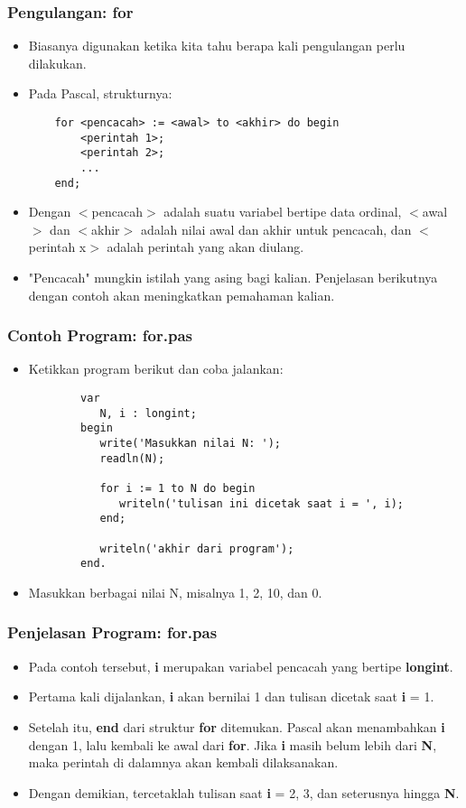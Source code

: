 \documentclass{beamer}
\begin{document}
\begin{frame}[fragile]
\frametitle{Pengulangan: for}
\begin{itemize}
	\item Biasanya digunakan ketika kita tahu berapa kali pengulangan perlu dilakukan.
	\item Pada Pascal, strukturnya:
	\begin{lstlisting}
	for <pencacah> := <awal> to <akhir> do begin
	    <perintah 1>;
	    <perintah 2>;
	    ...
	end;
	\end{lstlisting}
	\item Dengan $<$pencacah$>$ adalah suatu variabel bertipe data \alert{ordinal}, $<$awal$>$ dan $<$akhir$>$ adalah nilai awal dan akhir untuk pencacah, dan $<$perintah x$>$ adalah perintah yang akan diulang.
	\item "Pencacah" mungkin istilah yang asing bagi kalian. Penjelasan berikutnya dengan contoh akan meningkatkan pemahaman kalian.
\end{itemize}
\end{frame}

\begin{frame}[fragile]
\frametitle{Contoh Program: for.pas}
\begin{itemize}
	\item Ketikkan program berikut dan coba jalankan:
	\begin{lstlisting}
		var
		   N, i : longint;
		begin
		   write('Masukkan nilai N: ');
		   readln(N);
		
		   for i := 1 to N do begin
		      writeln('tulisan ini dicetak saat i = ', i);
		   end;
		   
		   writeln('akhir dari program');
		end.
	\end{lstlisting}
	\item Masukkan berbagai nilai N, misalnya 1, 2, 10, dan 0.
\end{itemize}
\end{frame}

\begin{frame}
\frametitle{Penjelasan Program: for.pas}
\begin{itemize}
	\item Pada contoh tersebut, \textbf{i} merupakan variabel pencacah yang bertipe \textbf{longint}.
	\item Pertama kali dijalankan, \textbf{i} akan bernilai 1 dan tulisan dicetak saat \textbf{i} = 1.
	\item Setelah itu, \textbf{end} dari struktur \textbf{for} ditemukan. Pascal akan menambahkan \textbf{i} dengan 1, lalu kembali ke awal dari \textbf{for}. Jika \textbf{i} masih belum lebih dari \textbf{N}, maka perintah di dalamnya akan kembali dilaksanakan.
	\item Dengan demikian, tercetaklah tulisan saat \textbf{i} = 2, 3, dan seterusnya hingga \textbf{N}.
\end{itemize}
\end{frame}
\end{document}

